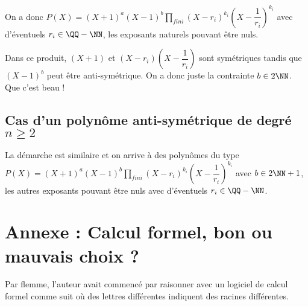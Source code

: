 \documentclass[12pt]{amsart}
\begin{document}
\medskip

On a donc
$\displaystyle P(X) = (X + 1)^a (X - 1)^b \prod_{fini} (X - r_i)^{k_i} \left( X - \dfrac1{r_i} \right)^{k_i}$ avec d'éventuels $r_i \in \QQ - \NN$, les exposants naturels pouvant être nuls.


\medskip

Dans ce produit, $(X + 1)$ et $(X - r_i) \left( X - \dfrac1{r_i} \right)$ sont symétriques tandis que $(X - 1)^b$ peut être anti-symétrique.
On a donc juste la contrainte $b \in 2 \NN$. Que c'est beau !


\subsection*{Cas d'un polynôme anti-symétrique de degré $n \geqslant 2$}

La démarche est similaire et on arrive à des polynômes du type
$\displaystyle P(X) = (X + 1)^a (X - 1)^b \prod_{fini} (X - r_i)^{k_i} \left( X - \dfrac1{r_i} \right)^{k_i}$
avec $b \in 2 \NN + 1$, les autres exposants pouvant être nuls avec d'éventuels $r_i \in \QQ - \NN$.



\section*{Annexe : Calcul formel, bon ou mauvais choix ?}

Par flemme, l'auteur avait commencé par raisonner avec un logiciel de calcul formel comme suit où des lettres différentes indiquent des racines différentes.
\end{document}
